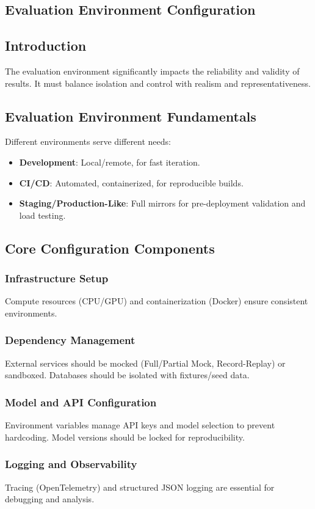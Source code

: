 \begin{TNtwocol}
\section{Evaluation Environment Configuration }
\subsection{Introduction}
The evaluation environment significantly impacts the reliability and validity of results. It must balance isolation and control with realism and representativeness.

\subsection{Evaluation Environment Fundamentals}
Different environments serve different needs:
\begin{itemize}
    \item \textbf{Development}: Local/remote, for fast iteration.
    \item \textbf{CI/CD}: Automated, containerized, for reproducible builds.
    \item \textbf{Staging/Production-Like}: Full mirrors for pre-deployment validation and load testing.
\end{itemize}

\subsection{Core Configuration Components}
\subsubsection{Infrastructure Setup}
Compute resources (CPU/GPU) and containerization (Docker) ensure consistent environments.
\subsubsection{Dependency Management}
External services should be mocked (Full/Partial Mock, Record-Replay) or sandboxed. Databases should be isolated with fixtures/seed data.
\subsubsection{Model and API Configuration}
Environment variables manage API keys and model selection to prevent hardcoding. Model versions should be locked for reproducibility.
\subsubsection{Logging and Observability}
Tracing (OpenTelemetry) and structured JSON logging are essential for debugging and analysis.


\end{TNtwocol}
